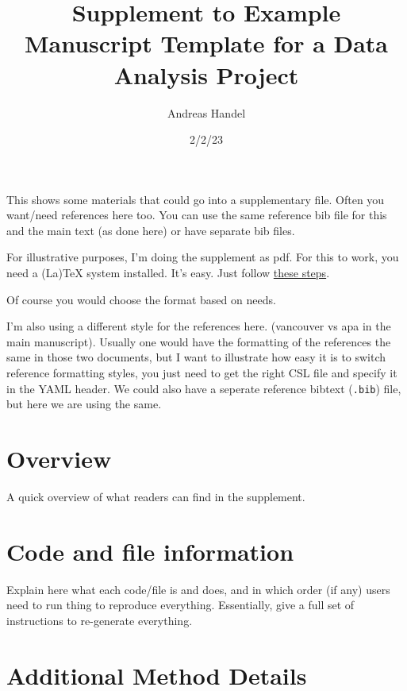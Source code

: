 \documentclass[
  letterpaper,
  DIV=11,
  numbers=noendperiod]{scrartcl}
\title{Supplement to Example Manuscript Template for a Data Analysis
Project}
\author{Andreas Handel}
\date{2/2/23}
\begin{document}
\maketitle
\ifdefined\Shaded\renewenvironment{Shaded}{\begin{tcolorbox}[frame hidden, borderline west={3pt}{0pt}{shadecolor}, enhanced, breakable, sharp corners, boxrule=0pt, interior hidden]}{\end{tcolorbox}}\fi

This shows some materials that could go into a supplementary file. Often
you want/need references here too. You can use the same reference bib
file for this and the main text (as done here) or have separate bib
files.

For illustrative purposes, I'm doing the supplement as pdf. For this to
work, you need a (La)TeX system installed. It's easy. Just follow
\href{https://quarto.org/docs/output-formats/pdf-basics.html}{these
steps}.

Of course you would choose the format based on needs.

I'm also using a different style for the references here. (vancouver vs
apa in the main manuscript). Usually one would have the formatting of
the references the same in those two documents, but I want to illustrate
how easy it is to switch reference formatting styles, you just need to
get the right CSL file and specify it in the YAML header. We could also
have a seperate reference bibtext (\texttt{.bib}) file, but here we are
using the same.

\hypertarget{overview}{%
\section{Overview}\label{overview}}

A quick overview of what readers can find in the supplement.

\hypertarget{code-and-file-information}{%
\section{Code and file information}\label{code-and-file-information}}

Explain here what each code/file is and does, and in which order (if
any) users need to run thing to reproduce everything. Essentially, give
a full set of instructions to re-generate everything.

\newpage{}

\hypertarget{additional-method-details}{%
\section{Additional Method Details}\label{additional-method-details}}
\end{document}
